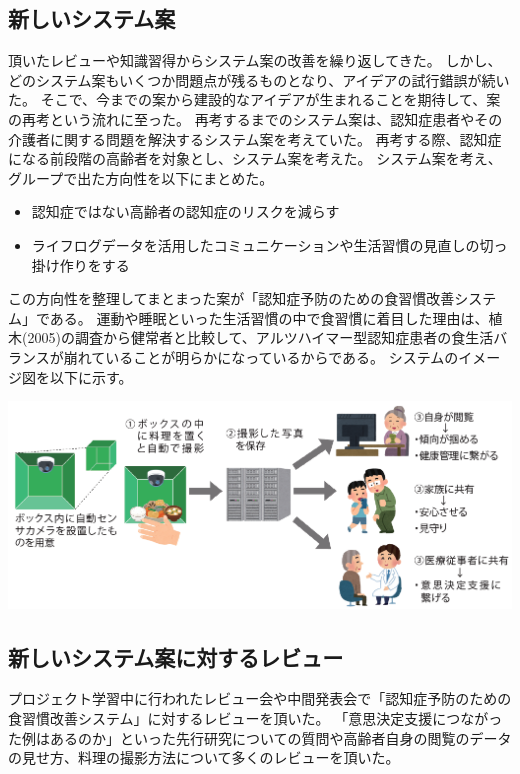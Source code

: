 \documentclass[../report]{subfiles}
\begin{document}
\subsection{新しいシステム案}
頂いたレビューや知識習得からシステム案の改善を繰り返してきた。
しかし、どのシステム案もいくつか問題点が残るものとなり、アイデアの試行錯誤が続いた。
そこで、今までの案から建設的なアイデアが生まれることを期待して、案の再考という流れに至った。
再考するまでのシステム案は、認知症患者やその介護者に関する問題を解決するシステム案を考えていた。
再考する際、認知症になる前段階の高齢者を対象とし、システム案を考えた。
システム案を考え、グループで出た方向性を以下にまとめた。
\begin{itemize}
    \item 認知症ではない高齢者の認知症のリスクを減らす
    \item ライフログデータを活用したコミュニケーションや生活習慣の見直しの切っ掛け作りをする
\end{itemize}
この方向性を整理してまとまった案が「認知症予防のための食習慣改善システム」である。
運動や睡眠といった生活習慣の中で食習慣に着目した理由は、植木(2005)の調査から健常者と比較して、アルツハイマー型認知症患者の食生活バランスが崩れていることが明らかになっている\cite{ueki}からである。
システムのイメージ図を以下に示す。
\begin{center}
    \includegraphics[width=15cm]{imgs/system-overview.png}
\end{center}

\subsection{新しいシステム案に対するレビュー}
プロジェクト学習中に行われたレビュー会や中間発表会で「認知症予防のための食習慣改善システム」に対するレビューを頂いた。
「意思決定支援につながった例はあるのか」といった先行研究についての質問や高齢者自身の閲覧のデータの見せ方、料理の撮影方法について多くのレビューを頂いた。
\end{document}
